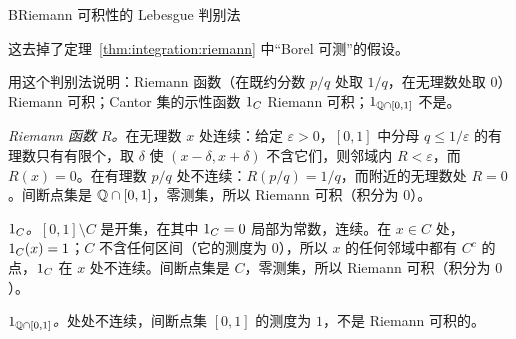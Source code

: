 \begin{probleme}{B}{Riemann 可积性的 Lebesgue 判别法}
\begin{questions}
\begin{solution}
这去掉了定理~\ref{thm:integration:riemann} 中“Borel 可测”的假设。
\end{solution}
\item 用这个判别法说明：Riemann 函数（在既约分数 $p/q$ 处取 $1/q$，在无理数处取 $0$）Riemann 可积；Cantor 集的示性函数 $1_C$ Riemann 可积；$1_{\mathbb{Q}\cap[0,1]}$ 不是。
\begin{solution}
\emph{Riemann 函数 $R$。}在无理数 $x$ 处连续：给定 $\varepsilon>0$，$[0,1]$ 中分母 $q\leqslant1/\varepsilon$ 的有理数只有有限个，取 $\delta$ 使 $(x-\delta,x+\delta)$ 不含它们，则邻域内 $R<\varepsilon$，而 $R(x)=0$。在有理数 $p/q$ 处不连续：$R(p/q)=1/q$，而附近的无理数处 $R=0$。间断点集是 $\mathbb{Q}\cap[0,1]$，零测集，所以 Riemann 可积（积分为 $0$）。

\emph{$1_C$。}$[0,1]\setminus C$ 是开集，在其中 $1_C=0$ 局部为常数，连续。在 $x\in C$ 处，$1_C(x)=1$；$C$ 不含任何区间（它的测度为 $0$），所以 $x$ 的任何邻域中都有 $C^c$ 的点，$1_C$ 在 $x$ 处不连续。间断点集是 $C$，零测集，所以 Riemann 可积（积分为 $0$）。

\emph{$1_{\mathbb{Q}\cap[0,1]}$。}处处不连续，间断点集 $[0,1]$ 的测度为 $1$，不是 Riemann 可积的。
\end{solution}
\end{questions}
\end{probleme}

